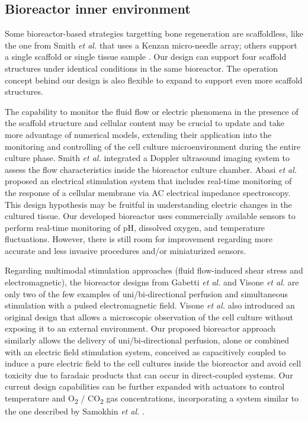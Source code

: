 \subsection{Bioreactor inner environment}
Some bioreactor-based strategies targetting bone regeneration are scaffoldless, like the one from Smith \textit{et al.} \cite{Smith2018-he} that uses a Kenzan micro-needle array; others support a single scaffold or single tissue sample \cite{Daneshgar2019-tu, Gabetti2022-hp, Schmid2018-rg, Rosser2018-zg, Birru2018-rj, Visone2018-sa}. Our design can support four scaffold structures under identical conditions in the same bioreactor. The operation concept behind our design is also flexible to expand to support even more scaffold structures.

The capability to monitor the fluid flow or electric phenomena in the presence of the scaffold structure and cellular content may be crucial to update and take more advantage of numerical models, extending their application into the monitoring and controlling of the cell culture microenvironment during the entire culture phase. Smith \textit{et al.} \cite{Smith2018-he} integrated a Doppler ultrasound imaging system to assess the flow characteristics inside the bioreactor culture chamber. Abasi \textit{et al.} \cite{Abasi2020-fn} proposed an electrical stimulation system that includes real-time monitoring of the response of a cellular membrane via AC electrical impedance spectroscopy. This design hypothesis may be fruitful in understanding electric changes in the cultured tissue. Our developed bioreactor uses commercially available sensors to perform real-time monitoring of pH, dissolved oxygen, and temperature fluctuations. However, there is still room for improvement regarding more accurate and less invasive procedures and/or miniaturized sensors.

Regarding multimodal stimulation approaches (fluid flow-induced shear stress and electromagnetic), the bioreactor designs from Gabetti \textit{et al.} \cite{Gabetti2022-hp} and Visone \textit{et al.} \cite{Visone2018-sa} are only two of the few examples of uni/bi-directional perfusion and simultaneous stimulation with a pulsed electromagnetic field. Visone \textit{et al.} \cite{Visone2018-sa} also introduced an original design that allows a microscopic observation of the cell culture without exposing it to an external environment. Our proposed bioreactor approach similarly allows the delivery of uni/bi-directional perfusion, alone or combined with an electric field stimulation system, conceived as capacitively coupled to induce a pure electric field to the cell cultures inside the bioreactor and avoid cell toxicity due to faradaic products that can occur in direct-coupled systems. Our current design capabilities can be further expanded with actuators to control temperature and O\textsubscript{2} / CO\textsubscript{2} gas concentrations, incorporating a system similar to the one described by Samokhin \textit{et al.} \cite{Samokhin2022-oy}.


